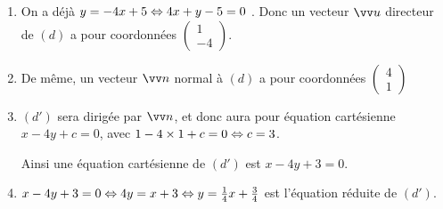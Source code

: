 \documentclass[a4paper,11pt]{article}
\begin{document}

\begin{enumerate}
	\item On a déjà $y=-4x+5 \Leftrightarrow 4x+y-5=0$ . Donc un vecteur $\vect{u}$ directeur de $(d)$ a pour coordonnées $\begin{pmatrix} 1 \\ -4 \end{pmatrix}$.
	\item De même, un vecteur $\vect{n}$ normal à $(d)$ a pour coordonnées $\begin{pmatrix} 4 \\ 1 \end{pmatrix}$
	\item $(d')$ sera dirigée par $\vect{n}$, et donc aura pour équation cartésienne $ x-4y+c=0$, avec $1 - 4 \times 1 + c = 0 \Leftrightarrow c = 3$.
	
	Ainsi une équation cartésienne de $(d')$ est $x - 4y + 3 = 0$.
	\item $x - 4y + 3 = 0 \Leftrightarrow 4y=x+3 \Leftrightarrow y=\tfrac{1}{4}x+\tfrac{3}{4}$ est l'équation réduite de $(d')$.
\end{enumerate}

\medskip

\end{document}
